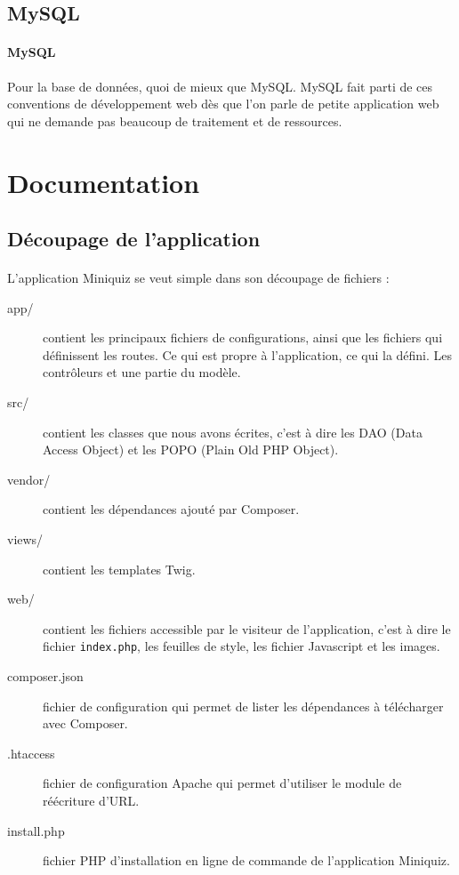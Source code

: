 \documentclass[12pt]{article}
\begin{document}
    \subsection{MySQL}
        \paragraph{MySQL} Pour la base de données, quoi de mieux que MySQL. MySQL fait parti de ces conventions de développement web dès que l'on parle de petite application web qui ne demande pas beaucoup de traitement et de ressources.
    

\section{Documentation}
    \subsection{Découpage de l'application}
        \paragraph{} L'application Miniquiz se veut simple dans son découpage de fichiers :
        \begin{description}
            \item[app/] contient les principaux fichiers de configurations, ainsi que les fichiers qui définissent les routes. Ce qui est propre à l'application, ce qui la défini. Les contrôleurs et une partie du modèle.
            \item[src/] contient les classes que nous avons écrites, c'est à dire les DAO (Data Access Object) et les POPO (Plain Old PHP Object). 
            \item[vendor/] contient les dépendances ajouté par Composer. 
            \item[views/] contient les templates Twig.
            \item[web/] contient les fichiers accessible par le visiteur de l'application, c'est à dire le fichier \texttt{index.php}, les feuilles de style, les fichier Javascript et les images.
            \item[composer.json] fichier de configuration qui permet de lister les dépendances à télécharger avec Composer. 
            \item[.htaccess] fichier de configuration Apache qui permet d'utiliser le module de réécriture d'URL.
            \item[install.php] fichier PHP d'installation en ligne de commande de l'application Miniquiz.
        \end{description}
        
\end{document}
